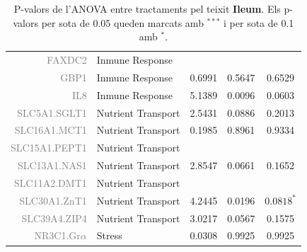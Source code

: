 \documentclass[english]{article}
\begin{document}
\begin{table}[ht]
\begin{tabular}{rlrrc}
  {\textcolor{gray}{FAXDC2}} & Inmune Response &  &  &  \\
  {\textcolor{gray}{GBP1}} & Inmune Response & 0.6991 & 0.5647 & 0.6529 \\
  {\textcolor{gray}{IL8}} & Inmune Response & 5.1389 & 0.0096 & 0.0603 \\
  {\textcolor{gray}{SLC5A1.SGLT1}} & Nutrient Transport& 2.5431 & 0.0886 & 0.2013 \\
  {\textcolor{gray}{SLC16A1.MCT1}} & Nutrient Transport & 0.1985 & 0.8961 & 0.9334 \\
  {\textcolor{gray}{SLC15A1.PEPT1}} & Nutrient Transport &  &  &  \\
  {\textcolor{gray}{SLC13A1.NAS1}} & Nutrient Transport & 2.8547 & 0.0661 & 0.1652 \\
  {\textcolor{gray}{SLC11A2.DMT1}} & Nutrient Transport &  &  &  \\
  {\textcolor{gray}{SLC30A1.ZnT1}} & Nutrient Transport & 4.2445 & 0.0196 & $0.0818^{*}$ \\
  {\textcolor{gray}{SLC39A4.ZIP4}} & Nutrient Transport & 3.0217 & 0.0567 & 0.1575 \\
  {\textcolor{gray}{NR3C1.Gr$\alpha$}} & Stress & 0.0308 & 0.9925 & 0.9925 \\
   \bottomrule
\end{tabular}
\onecolumn
\caption{P-valors de l'ANOVA entre tractaments pel teixit \textbf{Ileum}. Els p-valors per sota de 0.05 queden marcats amb $^{***}$ i per sota de 0.1 amb $^{*}$.}
\end{table}
\end{document}
